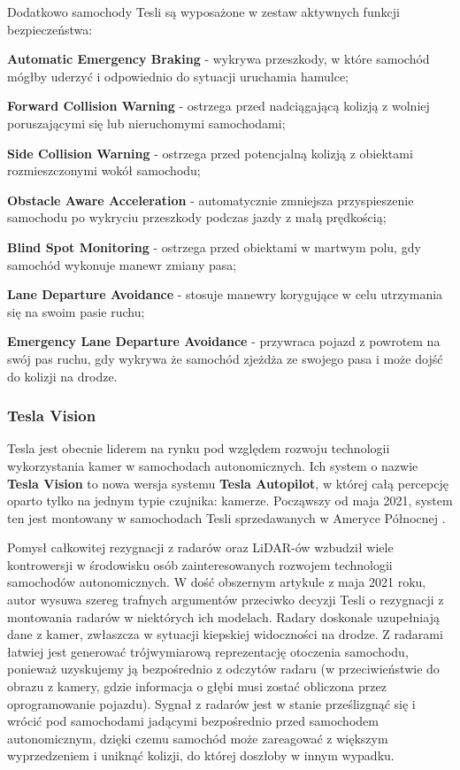 Dodatkowo samochody Tesli są wyposażone w zestaw aktywnych funkcji bezpieczeństwa:
\vspace{-0.25cm}
\begin{enumerate*}
\item \textbf{Automatic Emergency Braking} - wykrywa przeszkody, w które samochód mógłby uderzyć i odpowiednio do sytuacji uruchamia hamulce;
\item \textbf{Forward Collision Warning} - ostrzega przed nadciągającą kolizją z wolniej poruszającymi się lub nieruchomymi samochodami;
\item \textbf{Side Collision Warning} - ostrzega przed potencjalną kolizją z obiektami rozmieszczonymi wokół samochodu;
\item \textbf{Obstacle Aware Acceleration} - automatycznie zmniejsza przyspieszenie samochodu po wykryciu przeszkody podczas jazdy z małą prędkością;
\item \textbf{Blind Spot Monitoring} - ostrzega przed obiektami w martwym polu, gdy samochód wykonuje manewr zmiany pasa;
\item \textbf{Lane Departure Avoidance} - stosuje manewry korygujące w celu utrzymania się na swoim pasie ruchu;
\item \textbf{Emergency Lane Departure Avoidance} - przywraca pojazd z powrotem na swój pas ruchu, gdy wykrywa że samochód zjeżdża ze swojego pasa i może dojść do kolizji na drodze.
\end{enumerate*}

\subsubsection{Tesla Vision}
Tesla jest obecnie liderem na rynku pod względem rozwoju technologii wykorzystania kamer w samochodach autonomicznych. Ich system o nazwie 
\textbf{Tesla Vision} to nowa wersja systemu \textbf{Tesla Autopilot}, w której całą percepcję oparto tylko na jednym typie czujnika: kamerze. Począwszy od maja 2021, system ten jest montowany w samochodach Tesli sprzedawanych w Ameryce Północnej \cite{tesla:transToVision}.

Pomysł całkowitej rezygnacji z radarów oraz LiDAR-ów wzbudził wiele kontrowersji w środowisku osób zainteresowanych rozwojem technologii samochodów autonomicznych. W dość obszernym artykule \cite{torchinsky:teslaRemoveRadar} z maja 2021 roku, autor wysuwa szereg trafnych argumentów przeciwko decyzji Tesli o rezygnacji z montowania radarów w niektórych ich modelach. Radary doskonale uzupełniają dane z kamer, zwłaszcza w sytuacji kiepskiej widoczności na drodze. Z radarami łatwiej jest generować trójwymiarową reprezentację otoczenia samochodu, ponieważ uzyskujemy ją bezpośrednio z odczytów radaru (w przeciwieństwie do obrazu z kamery, gdzie informacja o głębi musi zostać obliczona przez oprogramowanie pojazdu). Sygnał z radarów jest w stanie prześlizgnąć się i wrócić pod samochodami jadącymi bezpośrednio przed samochodem autonomicznym, dzięki czemu samochód może zareagować z większym wyprzedzeniem i uniknąć kolizji, do której doszłoby w innym wypadku.

